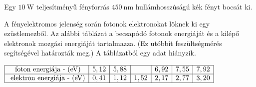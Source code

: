 \documentclass[addpoints,11pt,a4paper]{exam}
\begin{document}
\begin{questions}
		\question Egy $10\mathrm{~W} $ teljesítményű fényforrás $450\mathrm{~nm}$ hullámhosszúságú kék fényt bocsát ki.
		 
		 \question A fényelektromos jelenség során fotonok elektronokat löknek ki egy ezüstlemezből. Az alábbi táblázat a becsapódó fotonok energiáját és a kilépő elektronok mozgási energiáját tartalmazza. (Ez utóbbit feszültségmérés segítségével határozták meg.) A táblázatból egy adat hiányzik.
		 \begin{center}
		 	$\begin{array}{|c|c|c|c|c|c|c|}
		 	\hline \text { foton energiája - }(\mathrm{eV}) & 5,12 & 5,88 & & 6,92 & 7,55 & 7,92 \\
		 	\hline \text { elektron energiája - }(\mathrm{eV}) & 0,41 & 1,12 & 1,52 & 2,17 & 2,77 & 3,20 \\
		 	\hline
		 \end{array}$
		 \end{center}
\end{questions}
\end{document}
